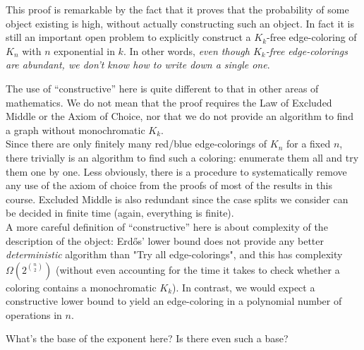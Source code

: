 \documentclass{article}
\begin{document}
This proof is remarkable by the fact that it proves that the probability of some object existing is high, without actually constructing such an object. In fact it is still an important open problem to explicitly construct a $K_k$-free edge-coloring of $K_n$ with $n$ exponential in $k$. In other words, {\it even though $K_k$-free edge-colorings are abundant, we don't know how to write down a single one}.

\begin{rmk}
  The use of ``constructive'' here is quite different to that in other areas of mathematics. We do not mean that the proof requires the Law of Excluded Middle or the Axiom of Choice, nor that we do not provide an algorithm to find a graph without monochromatic $K_k$. \\
  Since there are only finitely many red/blue edge-colorings of $K_n$ for a fixed $n$, there trivially is an algorithm to find such a coloring: enumerate them all and try them one by one. Less obviously, there is a procedure to systematically remove any use of the axiom of choice from the proofs of most of the results in this course. Excluded Middle is also redundant since the case splits we consider can be decided in finite time (again, everything is finite). \\
  A more careful definition of ``constructive'' here is about complexity of the description of the object: Erd\H os' lower bound does not provide any better {\it deterministic} algorithm than "Try all edge-colorings", and this has complexity $\Omega\left(2^{\binom n 2}\right)$ (without even accounting for the time it takes to check whether a coloring contains a monochromatic $K_k$). In contrast, we would expect a constructive lower bound to yield an edge-coloring in a polynomial number of operations in $n$.
\end{rmk}

\begin{question}
  What's the base of the exponent here? Is there even such a base?
\end{question}

\newlec

\printindex
\end{document}
